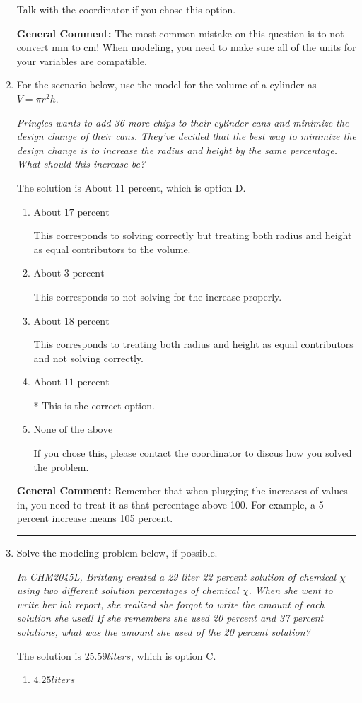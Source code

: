 \documentclass{extbook}[14pt]
\newcommand{\litem}[1]{\item #1

\rule{\textwidth}{0.4pt}}
\begin{document}
\begin{enumerate}
{\begin{enumerate}[label=\Alph*.]
Talk with the coordinator if you chose this option.
\end{enumerate}

\textbf{General Comment:} The most common mistake on this question is to not convert mm to cm! When modeling, you need to make sure all of the units for your variables are compatible.
}
\litem{
For the scenario below, use the model for the volume of a cylinder as $V = \pi r^2 h$.

\begin{center}
    \textit{ Pringles wants to add 36 \text{percent} more chips to their cylinder cans and minimize the design change of their cans. They've decided that the best way to minimize the design change is to increase the radius and height by the same percentage. What should this increase be? }
\end{center}
The solution is \( \text{About } 11 \text{ percent} \), which is option D.\begin{enumerate}[label=\Alph*.]
\item \( \text{About } 17 \text{ percent} \)

This corresponds to solving correctly but treating both radius and height as equal contributors to the volume.
\item \( \text{About } 3 \text{ percent} \)

This corresponds to not solving for the increase properly.
\item \( \text{About } 18 \text{ percent} \)

This corresponds to treating both radius and height as equal contributors and not solving correctly.
\item \( \text{About } 11 \text{ percent} \)

* This is the correct option.
\item \( \text{None of the above} \)

If you chose this, please contact the coordinator to discus how you solved the problem.
\end{enumerate}

\textbf{General Comment:} Remember that when plugging the increases of values in, you need to treat it as that percentage above 100. For example, a 5 percent increase means 105 percent.
}
\litem{
Solve the modeling problem below, if possible.

\begin{center}
    \textit{ In CHM2045L, Brittany created a 29 liter 22 percent solution of chemical $\chi$ using two different solution percentages of chemical $\chi$. When she went to write her lab report, she realized she forgot to write the amount of each solution she used! If she remembers she used 20 percent and 37 percent solutions, what was the amount she used of the 20 percent solution? }
\end{center}
The solution is \( 25.59 liters \), which is option C.\begin{enumerate}[label=\Alph*.]
\item \( 4.25 liters \)


\end{enumerate}}
\end{enumerate}
\end{document}
